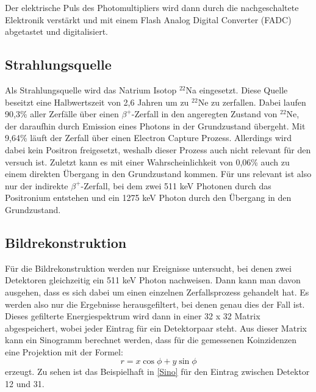 Der elektrische Puls des Photomultipliers wird dann durch die nachgeschaltete Elektronik verstärkt und mit einem Flash Analog Digital Converter (FADC) abgetastet und digitalisiert.

\subsection{Strahlungsquelle}
Als Strahlungsquelle wird das Natrium Isotop $^{22}$Na eingesetzt. Diese Quelle beseitzt eine Halbwertszeit von 2,6 Jahren um zu $^{22}$Ne zu zerfallen. Dabei laufen 90,3\% aller Zerfälle über einen $\beta^{+}$-Zerfall in den angeregten Zustand von $^{22}$Ne, der daraufhin durch Emission eines Photons in der Grundzustand übergeht. Mit 9,64\% läuft der Zerfall über einen Electron Capture Prozess. Allerdings wird dabei kein Positron freigesetzt, weshalb dieser Prozess auch nicht relevant für den versuch ist. Zuletzt kann es mit einer Wahrscheinlichkeit von 0,06\% auch zu einem direkten Übergang in den Grundzustand kommen. Für uns relevant ist also nur der indirekte $\beta^{+}$-Zerfall, bei dem zwei 511 keV Photonen durch das Positronium entstehen und ein 1275 keV Photon durch den Übergang in den Grundzustand.

\subsection{Bildrekonstruktion}
Für die Bildrekonstruktion werden nur Ereignisse untersucht, bei denen zwei Detektoren gleichzeitig ein 511 keV Photon nachweisen. Dann kann man davon ausgehen, dass es sich dabei um einen einzelnen Zerfallsprozess gehandelt hat. Es werden also nur die Ergebnisse herausgefiltert, bei denen genau dies der Fall ist. Dieses gefilterte Energiespektrum wird dann in einer 32 x 32 Matrix abgespeichert, wobei jeder Eintrag für ein Detektorpaar steht. Aus dieser Matrix kann ein Sinogramm berechnet werden, dass für die gemessenen Koinzidenzen eine Projektion mit der Formel:
\begin{equation}
	r = x \cos{\phi} + y \sin{\phi}
\end{equation}
erzeugt. Zu sehen ist das Beispielhaft in \cref{Sino} für den Eintrag zwischen Detektor 12 und 31.

